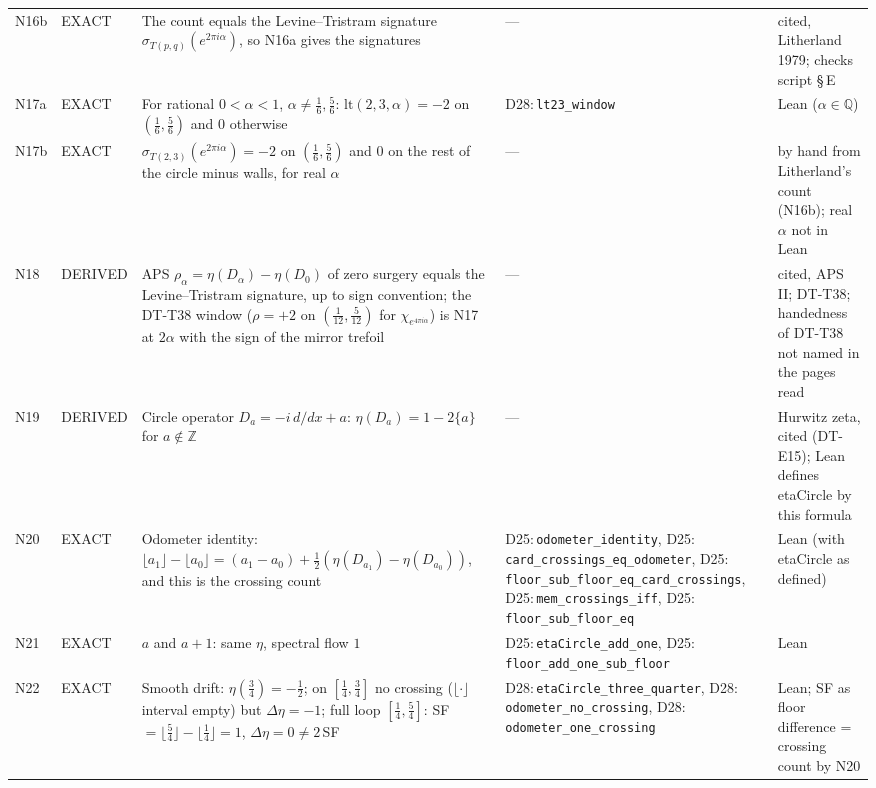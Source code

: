 \documentclass[11pt]{article}
\theoremstyle{definition}
\newcommand{\lean}[1]{\texttt{\small #1}}
\begin{document}
{\begin{longtable}{@{}L{0.05\textwidth}L{0.12\textwidth}L{0.26\textwidth}L{0.27\textwidth}L{0.17\textwidth}@{}}
N16b & EXACT & The count equals the Levine--Tristram signature $\sigma_{T(p,q)}(e^{2\pi i\alpha})$, so N16a gives the signatures & --- & cited, Litherland 1979; checks script \S\,E\\
N17a & EXACT & For rational $0<\alpha<1$, $\alpha\ne\tfrac16,\tfrac56$: $\mathrm{lt}(2,3,\alpha)=-2$ on $(\tfrac16,\tfrac56)$ and $0$ otherwise & D28:\,\lean{lt23\_\allowbreak{}window} & Lean ($\alpha\in\mathbb Q$)\\
N17b & EXACT & $\sigma_{T(2,3)}(e^{2\pi i\alpha})=-2$ on $(\tfrac16,\tfrac56)$ and $0$ on the rest of the circle minus walls, for real $\alpha$ & --- & by hand from Litherland's count (N16b); real $\alpha$ not in Lean\\
N18 & DERIVED & APS $\rho_\alpha=\eta(D_\alpha)-\eta(D_0)$ of zero surgery equals the Levine--Tristram signature, up to sign convention; the DT-T38 window ($\rho=+2$ on $(\tfrac1{12},\tfrac5{12})$ for $\chi_{e^{4\pi i\alpha}}$) is N17 at $2\alpha$ with the sign of the mirror trefoil & --- & cited, APS II; DT-T38; handedness of DT-T38 not named in the pages read\\
N19 & DERIVED & Circle operator $D_a=-i\,d/dx+a$: $\eta(D_a)=1-2\{a\}$ for $a\notin\mathbb Z$ & --- & Hurwitz zeta, cited (DT-E15); Lean defines etaCircle by this formula\\
N20 & EXACT & Odometer identity: $\lfloor a_1\rfloor-\lfloor a_0\rfloor=(a_1-a_0)+\tfrac12(\eta(D_{a_1})-\eta(D_{a_0}))$, and this is the crossing count & D25:\,\lean{odometer\_\allowbreak{}identity}, D25:\,\lean{card\_\allowbreak{}crossings\_\allowbreak{}eq\_\allowbreak{}odometer}, D25:\,\lean{floor\_\allowbreak{}sub\_\allowbreak{}floor\_\allowbreak{}eq\_\allowbreak{}card\_\allowbreak{}crossings}, D25:\,\lean{mem\_\allowbreak{}crossings\_\allowbreak{}iff}, D25:\,\lean{floor\_\allowbreak{}sub\_\allowbreak{}floor\_\allowbreak{}eq} & Lean (with etaCircle as defined)\\
N21 & EXACT & $a$ and $a+1$: same $\eta$, spectral flow $1$ & D25:\,\lean{etaCircle\_\allowbreak{}add\_\allowbreak{}one}, D25:\,\lean{floor\_\allowbreak{}add\_\allowbreak{}one\_\allowbreak{}sub\_\allowbreak{}floor} & Lean\\
N22 & EXACT & Smooth drift: $\eta(\tfrac34)=-\tfrac12$; on $[\tfrac14,\tfrac34]$ no crossing ($\lfloor\cdot\rfloor$ interval empty) but $\Delta\eta=-1$; full loop $[\tfrac14,\tfrac54]$: SF$=\lfloor\tfrac54\rfloor-\lfloor\tfrac14\rfloor=1$, $\Delta\eta=0\neq2\,$SF & D28:\,\lean{etaCircle\_\allowbreak{}three\_\allowbreak{}quarter}, D28:\,\lean{odometer\_\allowbreak{}no\_\allowbreak{}crossing}, D28:\,\lean{odometer\_\allowbreak{}one\_\allowbreak{}crossing} & Lean; SF as floor difference = crossing count by N20\\

\end{longtable}}
\end{document}
